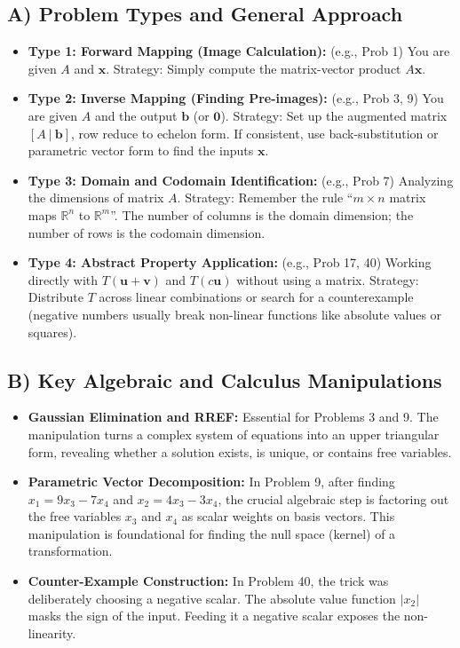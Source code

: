 \documentclass[11pt]{article}
\begin{document}
\subsection{A) Problem Types and General Approach}
\begin{itemize}
    \item \textbf{Type 1: Forward Mapping (Image Calculation):} (e.g., Prob 1) You are given $A$ and $\mathbf{x}$. Strategy: Simply compute the matrix-vector product $A\mathbf{x}$.
    \item \textbf{Type 2: Inverse Mapping (Finding Pre-images):} (e.g., Prob 3, 9) You are given $A$ and the output $\mathbf{b}$ (or $\mathbf{0}$). Strategy: Set up the augmented matrix $[A \ | \ \mathbf{b}]$, row reduce to echelon form. If consistent, use back-substitution or parametric vector form to find the inputs $\mathbf{x}$.
    \item \textbf{Type 3: Domain and Codomain Identification:} (e.g., Prob 7) Analyzing the dimensions of matrix $A$. Strategy: Remember the rule ``$m \times n$ matrix maps $\mathbb{R}^n$ to $\mathbb{R}^m$''. The number of columns is the domain dimension; the number of rows is the codomain dimension.
    \item \textbf{Type 4: Abstract Property Application:} (e.g., Prob 17, 40) Working directly with $T(\mathbf{u}+\mathbf{v})$ and $T(c\mathbf{u})$ without using a matrix. Strategy: Distribute $T$ across linear combinations or search for a counterexample (negative numbers usually break non-linear functions like absolute values or squares).
\end{itemize}

\subsection{B) Key Algebraic and Calculus Manipulations}
\begin{itemize}
    \item \textbf{Gaussian Elimination and RREF:} Essential for Problems 3 and 9. The manipulation turns a complex system of equations into an upper triangular form, revealing whether a solution exists, is unique, or contains free variables.
    \item \textbf{Parametric Vector Decomposition:} In Problem 9, after finding $x_1 = 9x_3 - 7x_4$ and $x_2 = 4x_3 - 3x_4$, the crucial algebraic step is factoring out the free variables $x_3$ and $x_4$ as scalar weights on basis vectors. This manipulation is foundational for finding the null space (kernel) of a transformation.
    \item \textbf{Counter-Example Construction:} In Problem 40, the trick was deliberately choosing a negative scalar. The absolute value function $|x_2|$ masks the sign of the input. Feeding it a negative scalar exposes the non-linearity.
\end{itemize}
\end{document}

